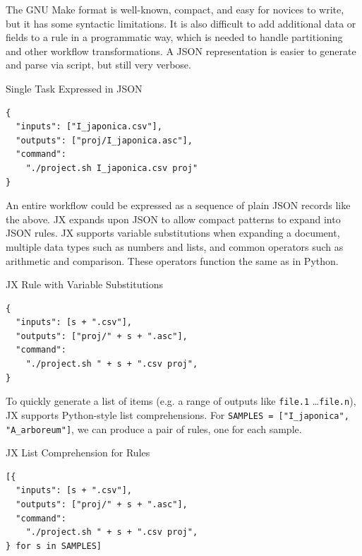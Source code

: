 \documentclass{beamer}
\newcommand{\jx}{JX\xspace}
\begin{document}
\begin{frame}[fragile]
\begin{minipage}[t][0.95\textheight]{0.33\textwidth}
\begin{block}{}
\parbox{\linewidth}{The GNU Make format is well-known, compact, and easy for novices to write, but it has some syntactic limitations.
It is also difficult to add additional data or fields to a rule
in a programmatic way, which is needed to handle partitioning and other
workflow transformations.
A JSON representation is easier to generate and parse via script,
but still very verbose.}
\end{block}

\begin{exampleblock}{Single Task Expressed in JSON\rule{0pt}{2.1ex}}
\begin{verbatim}
{
  "inputs": ["I_japonica.csv"],
  "outputs": ["proj/I_japonica.asc"],
  "command":
    "./project.sh I_japonica.csv proj"
}
\end{verbatim}
\end{exampleblock}

\vfill

\begin{block}{}
\parbox{\linewidth}{An entire workflow could be expressed as a sequence of plain                    
JSON records like the above.
\jx expands upon JSON to allow compact patterns to expand into JSON rules.
\jx supports variable substitutions when expanding a document,
multiple data types such as numbers and lists,
and common operators such as arithmetic and comparison.
These operators function the same as in Python.}
\end{block}

\begin{exampleblock}{JX Rule with Variable Substitutions\rule{0pt}{2.1ex}}
\begin{verbatim}
{
  "inputs": [s + ".csv"],
  "outputs": ["proj/" + s + ".asc"],
  "command":
    "./project.sh " + s + ".csv proj",
}
\end{verbatim}
\end{exampleblock}

\vfill

\begin{block}{}
\parbox{\linewidth}{To quickly generate a list of items
(e.g. a range of outputs like \texttt{file.1} \dots  \texttt{file.n}),
\jx supports Python-style list comprehensions.
For \texttt{SAMPLES = ["I\_japonica", "A\_arboreum"]},
we can produce a pair of rules,
one for each sample.}
\end{block}

\begin{exampleblock}{JX List Comprehension for Rules\rule{0pt}{2.1ex}}
\begin{verbatim}
[{
  "inputs": [s + ".csv"],
  "outputs": ["proj/" + s + ".asc"],
  "command":
    "./project.sh " + s + ".csv proj",
} for s in SAMPLES]
\end{verbatim}
\end{exampleblock}


\end{minipage}
\end{frame}
\end{document}
